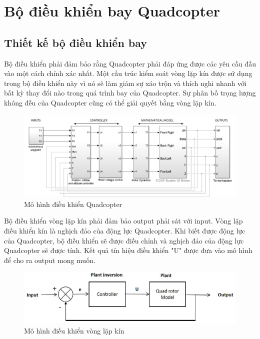      \section{Bộ điều khiển bay Quadcopter}
     \subsection{Thiết kế bộ điều khiển bay}
     		Bộ điều khiển phải đảm bảo rằng Quadcopter phải đáp ứng được các yêu cầu đầu vào một cách chính xác nhất. Một cấu trúc kiểm soát vòng lặp kín được sử dụng trong bộ điều khiển này vì nó sẽ làm giảm sự xáo trộn và thích nghi nhanh với bất kỳ thay đổi nào trong quá trình bay của Quadcopter. Sự phân bố trọng lượng không đều của Quadcopter cũng có thể giải quyết bằng vòng lặp kín.
            \\
            \begin{figure}[h!]
	        	\begin{center}
	        		\includegraphics[scale=0.8]{images/Cuong-ModelofQc.png}
	        		\caption{Mô hình điều khiển Quadcopter}
	        	\end{center}
        \end{figure}
        	Bộ điều khiển vòng lặp kín phải đảm bảo output phải sát với input. Vòng lặp điều khiển kín là nghịch đảo của động lực Quadcopter. Khi biết được động lực của Quadcopter, bộ điều khiển sẽ được điều chỉnh và nghịch đảo của động lực Quadcopter sẽ được tính. Kết quả tín hiệu điều khiển "U" được đưa vào mô hình để cho ra output mong muốn.
            \begin{figure}[h!]
	        	\begin{center}
	        		\includegraphics[scale=0.8]{images/Cuong-ClosedLoopControl.png}
	        		\caption{Mô hình điều khiển vòng lặp kín}
	        	\end{center}
        \end{figure} 
